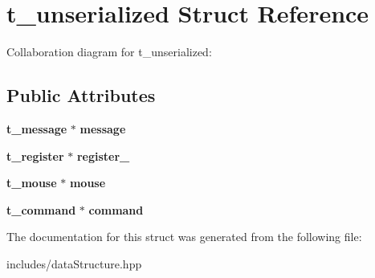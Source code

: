 \section{t\+\_\+unserialized Struct Reference}
\label{structt__unserialized}


Collaboration diagram for t\+\_\+unserialized\+:
\subsection*{Public Attributes}
\begin{DoxyCompactItemize}
\item 
\mbox{\label{structt__unserialized_ae9ce859624af4012b61c23517789481c}} 
\textbf{ t\+\_\+message} $\ast$ {\bfseries message}
\item 
\mbox{\label{structt__unserialized_a8c4c8dc99720b353dd51eca800dfe02c}} 
\textbf{ t\+\_\+register} $\ast$ {\bfseries register\+\_\+}
\item 
\mbox{\label{structt__unserialized_af75e67d0d44cbcb77154a1090e3380f0}} 
\textbf{ t\+\_\+mouse} $\ast$ {\bfseries mouse}
\item 
\mbox{\label{structt__unserialized_acdd08ba2aad8aba936bb5f7933dd6a0a}} 
\textbf{ t\+\_\+command} $\ast$ {\bfseries command}
\end{DoxyCompactItemize}


The documentation for this struct was generated from the following file\+:\begin{DoxyCompactItemize}
\item 
includes/data\+Structure.\+hpp\end{DoxyCompactItemize}
